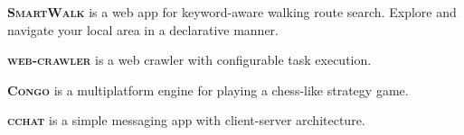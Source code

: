 
\vspace{1.0em}

\textsc{\textbf{SmartWalk}} \textsuperscript{\href{https://github.com/zhukovdm/smartwalk}{\faExternalLink*}} is a web app for keyword-aware walking route search. Explore and navigate your local area in a declarative manner.

\vspace{0.7em}

\textsc{\textbf{web-crawler}} \textsuperscript{\href{https://github.com/zhukovdm/web-crawler}{\faExternalLink*}} is a web crawler with configurable task execution.

\vspace{0.7em}

\textsc{\textbf{Congo}} \textsuperscript{\href{https://github.com/zhukovdm/Congo}{\faExternalLink*}} is a multiplatform engine for playing a chess-like strategy game.

\vspace{0.7em}

\textsc{\textbf{cchat}} \textsuperscript{\href{https://github.com/zhukovdm/cchat}{\faExternalLink*}} is a simple messaging app with client-server architecture.

\vspace{1.0em}
